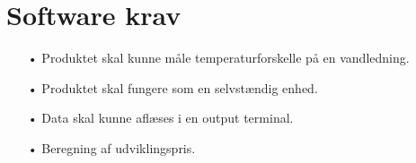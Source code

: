 \section{Software krav}
\begin{enumerate}
	\item[•]Produktet skal kunne måle temperaturforskelle på en vandledning.
	\item[•]Produktet skal fungere som en selvstændig enhed.
	\item[•]Data skal kunne aflæses i en output terminal.
	\item[•]Beregning af udviklingspris.
\end{enumerate}
